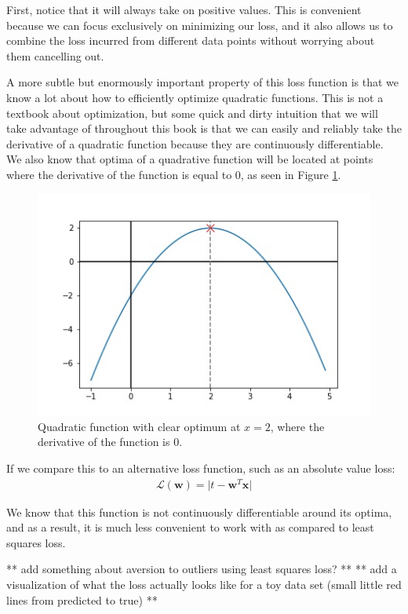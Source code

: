 First, notice that it will always take on positive values. This is convenient because we can focus exclusively on minimizing our loss, and it also allows us to combine the loss incurred from different data points without worrying about them cancelling out.

A more subtle but enormously important property of this loss function is that we know a lot about how to efficiently optimize quadratic functions. This is not a textbook about optimization, but some quick and dirty intuition that we will take advantage of throughout this book is that we can easily and reliably take the derivative of a quadratic function because they are continuously differentiable. We also know that optima of a quadrative function will be located at points where the derivative of the function is equal to 0, as seen in Figure \ref{fig:quad-deriv-at-2}.

\begin{figure}
    \centering
    \includegraphics[width=0.5\paperwidth]{../LinearRegression/fig/deriv_at_2_GEN.jpg}
    \caption{Quadratic function with clear optimum at $x=2$, where the derivative of the function is 0.}
    \label{fig:quad-deriv-at-2}
\end{figure}

If we compare this to an alternative loss function, such as an absolute value loss:
\begin{align}
    \mathcal{L}(\textbf{w}) = \lvert t - \textbf{w}^{T}\textbf{x} \rvert
\end{align}

We know that this function is not continuously differentiable around its optima, and as a result, it is much less convenient to work with as compared to least squares loss.

** add something about aversion to outliers using least squares loss? **
** add a visualization of what the loss actually looks like for a toy data set (small little red lines from predicted to true) **

